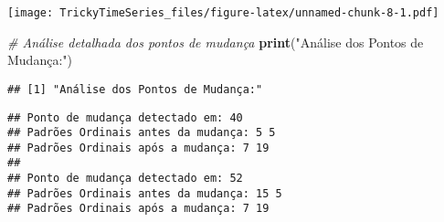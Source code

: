 \documentclass[
]{article}
\newenvironment{Shaded}{\begin{snugshade}}{\end{snugshade}}
\newcommand{\CommentTok}[1]{\textcolor[rgb]{0.56,0.35,0.01}{\textit{#1}}}
\newcommand{\ControlFlowTok}[1]{\textcolor[rgb]{0.13,0.29,0.53}{\textbf{#1}}}
\newcommand{\DecValTok}[1]{\textcolor[rgb]{0.00,0.00,0.81}{#1}}
\newcommand{\FunctionTok}[1]{\textcolor[rgb]{0.13,0.29,0.53}{\textbf{#1}}}
\newcommand{\NormalTok}[1]{#1}
\newcommand{\SpecialCharTok}[1]{\textcolor[rgb]{0.81,0.36,0.00}{\textbf{#1}}}
\newcommand{\StringTok}[1]{\textcolor[rgb]{0.31,0.60,0.02}{#1}}
\begin{document}
\texttt{[image: TrickyTimeSeries\_files/figure-latex/unnamed-chunk-8-1.pdf]}

\begin{Shaded}
\begin{Highlighting}[]
\CommentTok{\# Análise detalhada dos pontos de mudança}
\FunctionTok{print}\NormalTok{(}\StringTok{"Análise dos Pontos de Mudança:"}\NormalTok{)}
\end{Highlighting}
\end{Shaded}

\begin{verbatim}
## [1] "Análise dos Pontos de Mudança:"
\end{verbatim}

\begin{Shaded}
\end{Shaded}

\begin{verbatim}
## Ponto de mudança detectado em: 40 
## Padrões Ordinais antes da mudança: 5 5 
## Padrões Ordinais após a mudança: 7 19 
## 
## Ponto de mudança detectado em: 52 
## Padrões Ordinais antes da mudança: 15 5 
## Padrões Ordinais após a mudança: 7 19
\end{verbatim}
\end{document}
